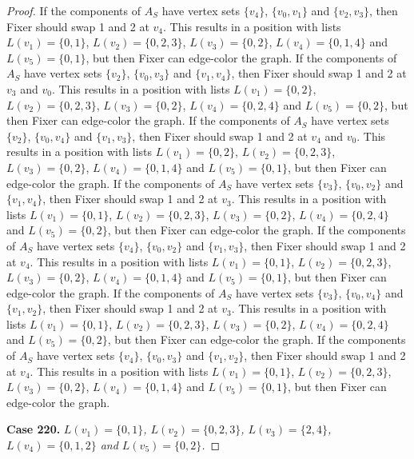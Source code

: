 \documentclass[12pt]{amsart}
\theoremstyle{plain}
\theoremstyle{definition}
\theoremstyle{remark}
\begin{document}
\begin{proof}
If the components of $A_S$ have vertex sets $\{v_4\}$, $\{v_0, v_1\}$ and $\{v_2, v_3\}$, then Fixer should swap 1 and 2 at $v_4$. This results in a position with lists $L(v_1) = \{0, 1\}$, $L(v_2) = \{0, 2, 3\}$, $L(v_3) = \{0, 2\}$, $L(v_4) = \{0, 1, 4\}$ and $L(v_5) = \{0, 1\}$, but then Fixer can edge-color the graph.
If the components of $A_S$ have vertex sets $\{v_2\}$, $\{v_0, v_3\}$ and $\{v_1, v_4\}$, then Fixer should swap 1 and 2 at $v_3$ and $v_0$. This results in a position with lists $L(v_1) = \{0, 2\}$, $L(v_2) = \{0, 2, 3\}$, $L(v_3) = \{0, 2\}$, $L(v_4) = \{0, 2, 4\}$ and $L(v_5) = \{0, 2\}$, but then Fixer can edge-color the graph.
If the components of $A_S$ have vertex sets $\{v_2\}$, $\{v_0, v_4\}$ and $\{v_1, v_3\}$, then Fixer should swap 1 and 2 at $v_4$ and $v_0$. This results in a position with lists $L(v_1) = \{0, 2\}$, $L(v_2) = \{0, 2, 3\}$, $L(v_3) = \{0, 2\}$, $L(v_4) = \{0, 1, 4\}$ and $L(v_5) = \{0, 1\}$, but then Fixer can edge-color the graph.
If the components of $A_S$ have vertex sets $\{v_3\}$, $\{v_0, v_2\}$ and $\{v_1, v_4\}$, then Fixer should swap 1 and 2 at $v_3$. This results in a position with lists $L(v_1) = \{0, 1\}$, $L(v_2) = \{0, 2, 3\}$, $L(v_3) = \{0, 2\}$, $L(v_4) = \{0, 2, 4\}$ and $L(v_5) = \{0, 2\}$, but then Fixer can edge-color the graph.
If the components of $A_S$ have vertex sets $\{v_4\}$, $\{v_0, v_2\}$ and $\{v_1, v_3\}$, then Fixer should swap 1 and 2 at $v_4$. This results in a position with lists $L(v_1) = \{0, 1\}$, $L(v_2) = \{0, 2, 3\}$, $L(v_3) = \{0, 2\}$, $L(v_4) = \{0, 1, 4\}$ and $L(v_5) = \{0, 1\}$, but then Fixer can edge-color the graph.
If the components of $A_S$ have vertex sets $\{v_3\}$, $\{v_0, v_4\}$ and $\{v_1, v_2\}$, then Fixer should swap 1 and 2 at $v_3$. This results in a position with lists $L(v_1) = \{0, 1\}$, $L(v_2) = \{0, 2, 3\}$, $L(v_3) = \{0, 2\}$, $L(v_4) = \{0, 2, 4\}$ and $L(v_5) = \{0, 2\}$, but then Fixer can edge-color the graph.
If the components of $A_S$ have vertex sets $\{v_4\}$, $\{v_0, v_3\}$ and $\{v_1, v_2\}$, then Fixer should swap 1 and 2 at $v_4$. This results in a position with lists $L(v_1) = \{0, 1\}$, $L(v_2) = \{0, 2, 3\}$, $L(v_3) = \{0, 2\}$, $L(v_4) = \{0, 1, 4\}$ and $L(v_5) = \{0, 1\}$, but then Fixer can edge-color the graph.

\noindent\textbf{Case 220.  }\textit{$L(v_1) = \{0, 1\}$, $L(v_2) = \{0, 2, 3\}$, $L(v_3) = \{2, 4\}$, $L(v_4) = \{0, 1, 2\}$ and $L(v_5) = \{0, 2\}$.}


\end{proof}
\end{document}
